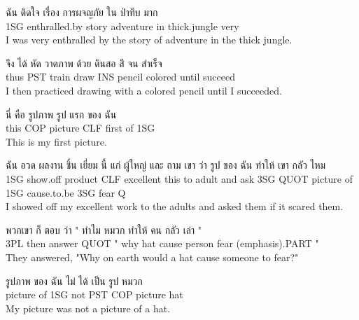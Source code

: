 \documentclass{book}
\begin{document}
	\begin{exe}
		\ex
		\gll ฉัน ติดใจ เรื่อง การผจญภัย ใน ป่าทึบ มาก\\
		\textsc{1SG} enthralled.by story adventure in thick.jungle very\\
		\glt  I was very enthralled by the story of adventure in the thick jungle.
	\end{exe}

	\begin{exe}
		\ex
		\gll จึง ได้ หัด วาดภาพ ด้วย ดินสอ สี จน สำเร็จ\\
		thus \textsc{PST} train draw \textsc{INS} pencil colored until succeed\\
		\glt  I then practiced drawing with a colored pencil until I succeeded.
	\end{exe}

	\begin{exe}
		\ex
		\gll นี่ คือ รูปภาพ รูป แรก ของ ฉัน\\
		this \textsc{COP} picture \textsc{CLF} first of \textsc{1SG}\\
		\glt  This is my first picture.
	\end{exe}

	\begin{exe}
		\ex
		\gll ฉัน อวด ผลงาน ชิ้น เยี่ยม นี้ แก่ ผู้ใหญ่ และ ถาม เขา ว่า รูป ของ ฉัน ทำให้ เขา กลัว ไหม\\
		\textsc{1SG} show.off product \textsc{CLF} excellent this to	 adult and ask \textsc{3SG} \textsc{QUOT} picture of \textsc{1SG} cause.to.be \textsc{3SG} fear \textsc{Q}\\
		\glt  I showed off my excellent work to the adults and asked them if it scared them.
	\end{exe}

	\begin{exe}
		\ex
		\gll พวกเขา ก็ ตอบ ว่า " ทำไม หมวก ทำให้ คน กลัว เล่า "\\
		\textsc{3PL} then answer \textsc{QUOT}  " why hat cause person fear (emphasis).\textsc{PART} "\\
		\glt  They answered, "Why on earth would a hat cause someone to fear?"
	\end{exe}

	\begin{exe}
		\ex
		\gll รูปภาพ ของ ฉัน ไม่ ได้ เป็น รูป หมวก\\
		picture of \textsc{1SG} not \textsc{PST} \textsc{COP} picture hat\\
		\glt  My picture was not a picture of a hat.
	\end{exe}
\end{document}
